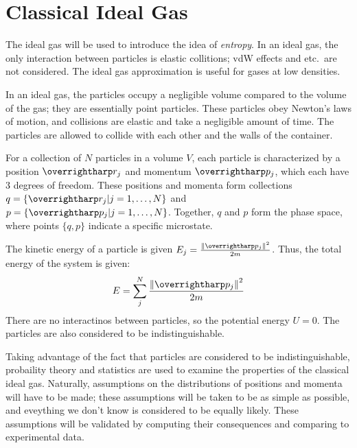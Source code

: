 \chapter{Classical Ideal Gas}
The ideal gas will be used to introduce the idea of \emph{entropy}. In an ideal gas, the only interaction between particles is elastic collitions; vdW effects and etc.\  are not considered. The ideal gas approximation is useful for gases at low densities.

In an ideal gas, the particles occupy a negligible volume compared to the volume of the gas; they are essentially point particles. These particles obey Newton's laws of motion, and collisions are elastic and take a negligible amount of time. The particles are allowed to collide with each other and the walls of the container.

For a collection of \(N\) particles in a volume \(V\), each particle is characterized by a position \(\vv{r}_j\) and momentum \(\vv{p}_j\), which each have 3 degrees of freedom.
These positions and momenta form collections \(q=\{\vv{r}_j|j=1,\dots,N\}\) and \(p=\{\vv{p}_j|j=1,\dots,N\}\). Together, \(q\) and \(p\) form the phase space, where points \(\{q,p\}\) indicate a specific microstate.

The kinetic energy of a particle is given \(E_j=\frac{\norm{\vv{p}_j}^2}{2m}\). Thus, the total energy of the system is given:
\begin{equation}
	E=\sum_j^N\frac{\norm{\vv{p}_j}^2}{2m}\label{eq2:energy}
\end{equation}
There are no interactinos between particles, so the potential energy \(U=0\). The particles are also considered to be indistinguishable.

Taking advantage of the fact that particles are considered to be indistinguishable, probaility theory and statistics are used to examine the properties of the classical ideal gas. 
Naturally, assumptions on the distributions of positions and momenta will have to be made; these assumptions will be taken to be as simple as possible, and eveything we don't know is considered to be equally likely.
These assumptions will be validated by computing their consequences and comparing to experimental data.
